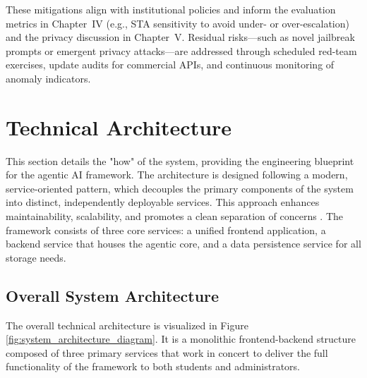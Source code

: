 These mitigations align with institutional policies and inform the evaluation metrics in Chapter~IV (e.g., STA sensitivity to avoid under- or over-escalation) and the privacy discussion in Chapter~V. Residual risks---such as novel jailbreak prompts or emergent privacy attacks---are addressed through scheduled red-team exercises, update audits for commercial APIs, and continuous monitoring of anomaly indicators.



\section{Technical Architecture}
\label{chap:technical_architecture}

This section details the "how" of the system, providing the engineering blueprint for the agentic AI framework. The architecture is designed following a modern, service-oriented pattern, which decouples the primary components of the system into distinct, independently deployable services. This approach enhances maintainability, scalability, and promotes a clean separation of concerns \cite{newman2021buildingmicroservices, richards2020softwarearchitecture}. The framework consists of three core services: a unified frontend application, a backend service that houses the agentic core, and a data persistence service for all storage needs.

\subsection{Overall System Architecture}
\label{sec:overall_system_architecture}

The overall technical architecture is visualized in Figure \ref{fig:system_architecture_diagram}. It is a monolithic frontend-backend structure composed of three primary services that work in concert to deliver the full functionality of the framework to both students and administrators.

